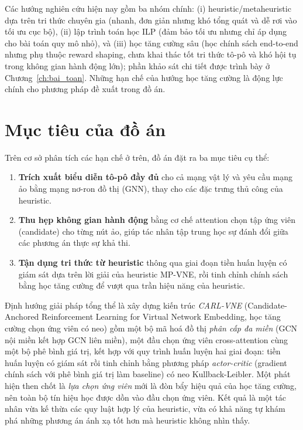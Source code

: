 \documentclass[../DoAn.tex]{subfiles}
\begin{document}
Các hướng nghiên cứu hiện nay gồm ba nhóm chính: (i) heuristic/metaheuristic dựa trên tri thức chuyên gia (nhanh, đơn giản nhưng khó tổng quát và dễ rơi vào tối ưu cục bộ), (ii) lập trình toán học ILP (đảm bảo tối ưu nhưng chỉ áp dụng cho bài toán quy mô nhỏ), và (iii) học tăng cường sâu (học chính sách end-to-end nhưng phụ thuộc reward shaping, chưa khai thác tốt tri thức tô-pô và khó hội tụ trong không gian hành động lớn); phần khảo sát chi tiết được trình bày ở Chương~\ref{ch:bai_toan}. Những hạn chế của hướng học tăng cường là động lực chính cho phương pháp đề xuất trong đồ án.

\section{Mục tiêu của đồ án}

Trên cơ sở phân tích các hạn chế ở trên, đồ án đặt ra ba mục tiêu cụ thể:

\begin{enumerate}
\item \textbf{Trích xuất biểu diễn tô-pô đầy đủ} cho cả mạng vật lý và yêu cầu mạng ảo bằng mạng nơ-ron đồ thị (GNN), thay cho các đặc trưng thủ công của heuristic.
\item \textbf{Thu hẹp không gian hành động} bằng cơ chế attention chọn tập ứng viên (candidate) cho từng nút ảo, giúp tác nhân tập trung học sự đánh đổi giữa các phương án thực sự khả thi.
\item \textbf{Tận dụng tri thức từ heuristic} thông qua giai đoạn tiền huấn luyện có giám sát dựa trên lời giải của heuristic MP-VNE, rồi tinh chỉnh chính sách bằng học tăng cường để vượt qua trần hiệu năng của heuristic.
\end{enumerate}

Định hướng giải pháp tổng thể là xây dựng kiến trúc \textit{CARL-VNE} (Candidate-Anchored Reinforcement Learning for Virtual Network Embedding, học tăng cường chọn ứng viên có neo) gồm một bộ mã hoá đồ thị \textit{phân cấp đa miền} (GCN nội miền kết hợp GCN liên miền), một đầu chọn ứng viên cross-attention cùng một bộ phê bình giá trị, kết hợp với quy trình huấn luyện hai giai đoạn: tiền huấn luyện có giám sát rồi tinh chỉnh bằng phương pháp \textit{actor-critic} (gradient chính sách với phê bình giá trị làm baseline) có neo Kullback-Leibler. Một phát hiện then chốt là \textit{lựa chọn ứng viên} mới là đòn bẩy hiệu quả của học tăng cường, nên toàn bộ tín hiệu học được dồn vào đầu chọn ứng viên. Kết quả là một tác nhân vừa kế thừa các quy luật hợp lý của heuristic, vừa có khả năng tự khám phá những phương án ánh xạ tốt hơn mà heuristic không nhìn thấy.
\end{document}
